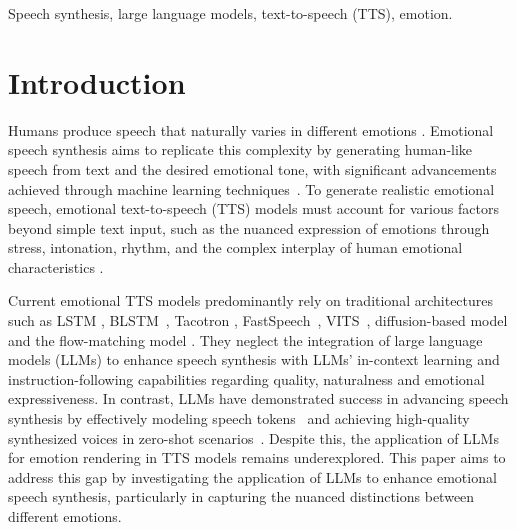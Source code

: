 \documentclass[conference]{IEEEtran}
\begin{document}
\begin{IEEEkeywords}
Speech synthesis, large language models, text-to-speech (TTS), emotion.
\end{IEEEkeywords}
\vspace{-0.3cm}
\section{Introduction}
\vspace{-0.1cm}
Humans produce speech that naturally varies in different emotions \cite{yasuda2023text,chen2023vector,khanam2022text,nose2007style}.
Emotional speech synthesis aims to replicate this complexity by generating human-like speech from text and the desired emotional tone, with significant advancements achieved through machine learning techniques~\cite{zhou2022speech,diatlova2023emospeech,lee2017emotional,li2024mm}.
To generate realistic emotional speech, emotional text-to-speech (TTS) models must account for various factors beyond simple text input, such as the nuanced expression of emotions through stress, intonation, rhythm, and the complex interplay of human emotional characteristics \cite{nose2007style,wang2018style}.

Current emotional TTS models predominantly rely on traditional architectures such as LSTM \cite{lei2021fine}, BLSTM~\cite{liu2024emotion}, Tacotron \cite{li2021controllable,um2020emotional,li2024mm,wang2018style}, FastSpeech~\cite{kim2021expressive,diatlova2023emospeech,lee2017emotional,li2024mm,yang2024instructtts}, VITS~\cite{zhao2023emotion}, diffusion-based model \cite{guo2023emodiff} and the flow-matching model \cite{wu2024laugh}. They neglect the integration of large language models (LLMs) to enhance speech synthesis with LLMs' in-context learning and instruction-following capabilities regarding quality, naturalness and emotional expressiveness.
In contrast, LLMs have demonstrated success in advancing speech synthesis by effectively modeling speech tokens~\cite{kimclam} and achieving high-quality synthesized voices in zero-shot scenarios~\cite{du2024cosyvoice, wang2023neural}. 
Despite this, the application of LLMs for emotion rendering in TTS models remains underexplored. This paper aims to address this gap by investigating the application of LLMs to enhance emotional speech synthesis, particularly in capturing the nuanced distinctions between different emotions.

\end{document}
